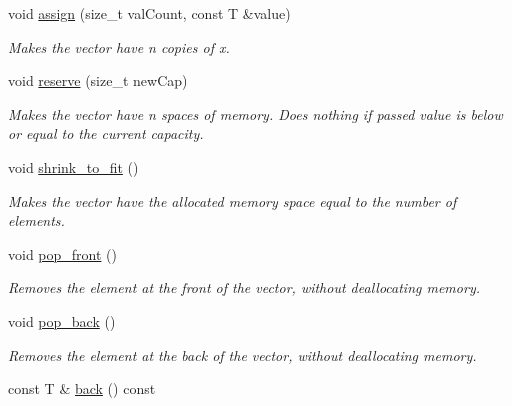 \begin{DoxyCompactItemize}
void \hyperlink{classsc_1_1Vector_a6b349db72f104336fe4bf06dffaa4979}{assign} (size\+\_\+t val\+Count, const T \&value)
\begin{DoxyCompactList}\small\item\em Makes the vector have n copies of x. \end{DoxyCompactList}\item 
void \hyperlink{classsc_1_1Vector_a16435ab7524542a2197d202f45dc80d8}{reserve} (size\+\_\+t new\+Cap)
\begin{DoxyCompactList}\small\item\em Makes the vector have n spaces of memory. Does nothing if passed value is below or equal to the current capacity. \end{DoxyCompactList}\item 
\mbox{\label{classsc_1_1Vector_a3353c5af380f7e50f87ca9a8199459e2}} 
void \hyperlink{classsc_1_1Vector_a3353c5af380f7e50f87ca9a8199459e2}{shrink\+\_\+to\+\_\+fit} ()
\begin{DoxyCompactList}\small\item\em Makes the vector have the allocated memory space equal to the number of elements. \end{DoxyCompactList}\item 
\mbox{\label{classsc_1_1Vector_a51b1b215ab5bfb9b6fdfc7104838efec}} 
void \hyperlink{classsc_1_1Vector_a51b1b215ab5bfb9b6fdfc7104838efec}{pop\+\_\+front} ()
\begin{DoxyCompactList}\small\item\em Removes the element at the front of the vector, without deallocating memory. \end{DoxyCompactList}\item 
\mbox{\label{classsc_1_1Vector_ab95364b7ec9fe400a6f9aeb00ce52487}} 
void \hyperlink{classsc_1_1Vector_ab95364b7ec9fe400a6f9aeb00ce52487}{pop\+\_\+back} ()
\begin{DoxyCompactList}\small\item\em Removes the element at the back of the vector, without deallocating memory. \end{DoxyCompactList}\item 
\mbox{\label{classsc_1_1Vector_a94c8f2da6a9eaac7e48d3b4374621e88}} 
const T \& \hyperlink{classsc_1_1Vector_a94c8f2da6a9eaac7e48d3b4374621e88}{back} () const

\end{DoxyCompactItemize}
